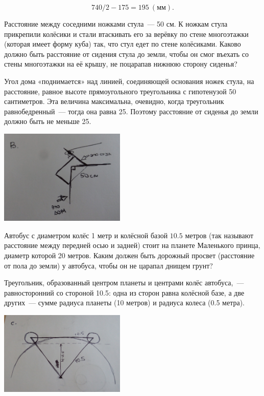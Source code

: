 \begin{itemize}

\itA $$740/2-175 = \SI{195}{(\text{мм})}.$$

\itB Расстояние между соседними ножками стула~— 50 см. К ножкам стула прикрепили колёсики и стали втаскивать его за верёвку по стене многоэтажки (которая имеет форму куба) так, что стул едет по стене колёсиками. Каково должно быть расстояние от сидения стула до земли, чтобы он смог въехать со стены многоэтажки на её крышу, не поцарапав нижнюю сторону сиденья?

Угол дома «поднимается» над линией, соединяющей основания ножек стула, на расстояние, равное высоте прямоугольного треугольника с гипотенузой 50 сантиметров. Эта величина максимальна, очевидно, когда треугольник равнобедренный~— тогда она равна \SI{25}{}. Поэтому расстояние от сиденья до земли должно быть не меньше \SI{25}{}.

\begin{center}
	\includegraphics[natwidth=3513,natheight=2640,width=6cm]{figures/2018-clearances-b}
\end{center}

\itC Автобус с диаметром колёс 1 метр и колёсной базой $10.5$ метров (так называют расстояние между передней осью и задней) стоит на планете Маленького принца, диаметр которой 20 метров. Каким должен быть дорожный просвет (расстояние от пола до земли) у автобуса, чтобы он не царапал днищем грунт?

Треугольник, образованный центром планеты и центрами колёс автобуса,~— равносторонний со стороной \SI{10.5}{}: одна из сторон равна колёсной базе, а две других~— сумме радиуса планеты (10 метров) и радиуса колеса (0.5 метра).

\begin{center}
	\includegraphics[natwidth=3716,natheight=2460,width=6cm]{figures/2018-clearances-c}
\end{center}


\end{itemize}
